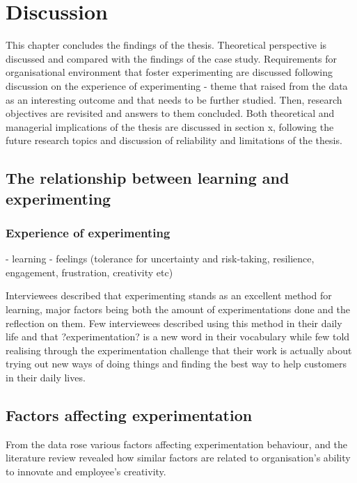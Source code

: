 \chapter{Discussion}
This chapter concludes the findings of the thesis. Theoretical perspective is discussed and compared with the findings of the case study. Requirements for organisational environment that foster experimenting are discussed following discussion on the experience of experimenting - theme that raised from the data as an interesting outcome and that needs to be further studied. Then, research objectives are revisited and answers to them concluded. Both theoretical and managerial implications of the thesis are discussed in section x, following the future research topics and discussion of reliability and limitations of the thesis. 


\section{The relationship between learning and experimenting}

\subsection{Experience of experimenting}
- learning 
- feelings (tolerance for uncertainty and risk-taking, resilience, engagement, frustration, creativity etc) 

Interviewees described that experimenting stands as an excellent method for learning, major factors being both the amount of experimentations done and the reflection on them. Few interviewees described using this method in their daily life and that ?experimentation? is a new word in their vocabulary while few told realising through the experimentation challenge that their work is actually about trying out new ways of doing things and finding the best way to help customers in their daily lives.

\section{Factors affecting experimentation}
From the data rose various factors affecting experimentation behaviour, and the literature review revealed how similar factors are related to organisation's ability to innovate and employee's creativity. 


